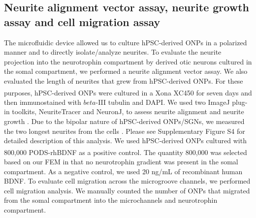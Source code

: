 \documentclass[review]{elsarticle}
\begin{document}
\subsection{Neurite alignment vector assay, neurite growth assay and cell migration assay}
The microfluidic device allowed us to culture hPSC-derived ONPs in a polarized manner and to directly isolate/analyze neurites. To evaluate the neurite projection into the neurotrophin compartment by derived otic neurons cultured in the somal compartment, we performed a neurite alignment vector assay. We also evaluated the length of neurites that grew from hPSC-derived ONPs. For these purposes, hPSC-derived ONPs were cultured in a Xona\textsuperscript{\texttrademark} XC450 for seven days and then immunostained with $beta$-III tubulin and DAPI. We used two ImageJ plug-in toolkits, NeuriteTracer and NeuronJ, to assess neurite alignment and neurite growth \cite{Pool2008, Meijering2004}. Due to the bipolar nature of hPSC-derived ONPs/SGNs, we measured the two longest neurites from the cells \cite{Matsuoka2017,Anniko1995}. Please see Supplementary Figure S4 for detailed description of this analysis. We used hPSC-derived ONPs cultured with 800,000 PODS\textsuperscript{\textregistered}-rhBDNF as a positive control. The quantity 800,000 was selected based on our FEM in that no neurotrophin gradient was present in the somal compartment. As a negative control, we used 20 ng/mL of recombinant human BDNF. To evaluate cell migration across the microgroove channels, we performed cell migration analysis. We manually counted the number of ONPs that migrated from the somal compartment into the microchannels and neurotrophin compartment. 
\end{document}
